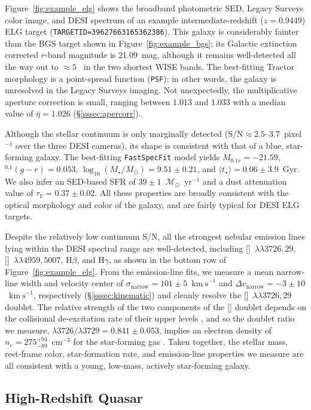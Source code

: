 \documentclass[modern,linenumbers]{aastex702}
\newcommand{\fastspecfit}{\texttt{FastSpecFit}}
\newcommand{\kms}{\ensuremath{\mathrm{km~s}^{-1}}}
\newcommand{\oii}{[\ion{O}{2}]}
\newcommand{\hb}{\ensuremath{\mathrm{H}\beta}}
\newcommand{\hg}{\ensuremath{\mathrm{H}\gamma}}
\newcommand{\oiidoublet}{[\ion{O}{2}]~$\lambda\lambda3726,29$}
\newcommand{\oiiidoublet}{[\ion{O}{3}]~$\lambda\lambda4959,5007$}
\newcommand{\tauv}{\ensuremath{\tau_V}}
\newcommand{\msun}{\ensuremath{\mathcal{M}_{\odot}}}
\begin{document}
Figure~\ref{fig:example_elg} shows the broadband photometric SED,
Legacy Surveys color image, and DESI spectrum of an example
intermediate-redshift ($z=0.9449$) ELG target
(\texttt{TARGETID=39627663165362386}). This galaxy is considerably
fainter than the BGS target shown in Figure~\ref{fig:example_bgs}; its
Galactic extinction corrected $r$-band magnitude is 21.09~mag,
although it remains well-detected all the way out to
$\approx5$~\micron{} in the two shortest WISE bands. The best-fitting
Tractor morphology is a point-spread function (\texttt{PSF}); in other
words, the galaxy is unresolved in the Legacy Surveys imaging. Not
unexpectedly, the multiplicative aperture correction is small, ranging
between 1.013 and 1.033 with a median value of $\bar\eta=1.026$
(\S\ref{sssec:apercorr}).

Although the stellar continuum is only marginally detected
($\mathrm{S/N}\approx2.5$--$3.7$~pixel$^{-1}$ over the three DESI
cameras), its shape is consistent with that of a blue, star-forming
galaxy. The best-fitting \fastspecfit{} model yields
$M_{0.1r}=-21.59$, $^{0.1}(g-r)=0.053$,
$\log_{10}(M_\star/M_\odot)=9.51\pm0.21$, and $\langle
t_\star\rangle=0.06\pm3.9$~Gyr. We also infer an SED-based SFR of
$39\pm1$~\msun{}~yr$^{-1}$ and a dust attenuation value of
$\tauv=0.37\pm0.02$. All these properties are broadly consistent with
the optical morphology and color of the galaxy, and are fairly typical
for DESI ELG targets.

Despite the relatively low continuum S/N, all the strongest nebular
emission lines lying within the DESI spectral range are well-detected,
including \oiidoublet, \oiiidoublet, \hb, and \hg, as shown in the
bottom row of Figure~\ref{fig:example_elg}. From the emission-line
fits, we measure a mean narrow-line width and velocity center of
$\sigma_\mathrm{narrow}=101\pm5$~\kms{} and $\Delta
v_\mathrm{narrow}=-3\pm10$~\kms, respectively
(\S\ref{sssec:kinematic}) and cleanly resolve the \oiidoublet{}
doublet. The relative strength of the two components of the \oii{}
doublet depends on the collisional de-excitation rate of their upper
levels \citep{osterbrock89a}, and so the doublet ratio we measure,
$\lambda3726/\lambda3729=0.841\pm0.053$, implies an electron density
of $n_e=275^{+94}_{-89}$~cm$^{-3}$ for the star-forming gas
\citep{luridiana15a}. Taken together, the stellar mass, rest-frame
color, star-formation rate, and emission-line properties we measure
are all consistent with a young, low-mass, actively star-forming
galaxy.

\subsection{High-Redshift Quasar}
\label{ssec:example_qso}
\end{document}
